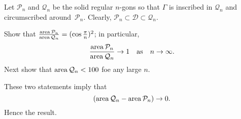 Let $\mathcal{P}_n$ and $\mathcal{Q}_n$ be the solid regular $n$-gons
so that $\Gamma$ is inscribed in $\mathcal{Q}_n$ and circumscribed around~$\mathcal{P}_n$.
Clearly,
$\mathcal{P}_n\subset\mathcal{D}\subset\mathcal{Q}_n$.

Show that 
$\tfrac{\mathop{\rm area}\nolimits\mathcal{P}_n}{\mathop{\rm area}\nolimits\mathcal{Q}_n}=(\cos\tfrac\pi n)^2$;
in particular, 
$$\frac{\mathop{\rm area}\nolimits\mathcal{P}_n}{\mathop{\rm area}\nolimits\mathcal{Q}_n}\to 1
\quad
\text{as}
\quad
n\to\infty.$$
Next show that $\mathop{\rm area}\nolimits\mathcal{Q}_n<100$ foe any large $n$.

These two statements imply that
\[(\mathop{\rm area}\nolimits\mathcal{Q}_n-\mathop{\rm area}\nolimits\mathcal{P}_n)\to 0.\]
Hence the result.

\spell{\end{multicols}}{}

\newpage
